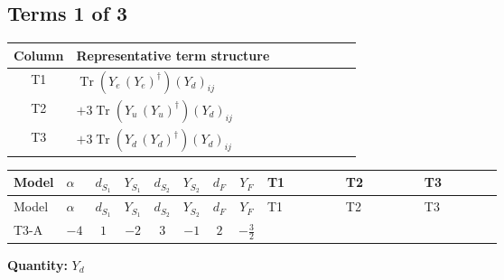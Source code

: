 \documentclass[8pt]{article}
\begin{document}
\begin{landscape}
\subsection*{Terms 1 of 3}
\begin{center}
\begin{tabular}{@{}c >{\raggedright\arraybackslash}p{0.82\linewidth}@{}}
\toprule
Column & Representative term structure \\
\midrule
T1 & \(\displaystyle \operatorname{Tr}\!\left({Y_e}\,\left({Y_e}\right)^{\dagger}\right) \left({Y_d}\right)_{ij}\) \\
\midrule
T2 & \(\displaystyle +3 \operatorname{Tr}\!\left({Y_u}\,\left({Y_u}\right)^{\dagger}\right) \left({Y_d}\right)_{ij}\) \\
\midrule
T3 & \(\displaystyle +3 \operatorname{Tr}\!\left({Y_d}\,\left({Y_d}\right)^{\dagger}\right) \left({Y_d}\right)_{ij}\) \\
\midrule
\bottomrule
\end{tabular}
\end{center}
\smallskip
\tiny
\begin{longtable}{@{}llcccccc >{\raggedright\arraybackslash}p{0.21\linewidth} >{\raggedright\arraybackslash}p{0.21\linewidth} >{\raggedright\arraybackslash}p{0.21\linewidth}@{}}
\toprule
Model & $\alpha$ & $d_{S_1}$ & $Y_{S_1}$ & $d_{S_2}$ & $Y_{S_2}$ & $d_F$ & $Y_F$ & T1 & T2 & T3 \\
\midrule
\endfirsthead
\toprule
Model & $\alpha$ & $d_{S_1}$ & $Y_{S_1}$ & $d_{S_2}$ & $Y_{S_2}$ & $d_F$ & $Y_F$ & T1 & T2 & T3 \\
\midrule
\endhead
T3-A & $-4$ & $1$ & $-2$ & $3$ & $-1$ & $2$ & $-\frac{3}{2}$ & \scriptsize\adjustbox{max width=\linewidth}{$\begin{gathered} \operatorname{Tr}\!\left({Y_e}\,\left({Y_e}\right)^{\dagger}\right) \left({Y_d}\right)_{ij}\end{gathered}$} & \scriptsize\adjustbox{max width=\linewidth}{$\begin{gathered} +3 \operatorname{Tr}\!\left({Y_u}\,\left({Y_u}\right)^{\dagger}\right) \left({Y_d}\right)_{ij}\end{gathered}$} & \scriptsize\adjustbox{max width=\linewidth}{$\begin{gathered} +3 \operatorname{Tr}\!\left({Y_d}\,\left({Y_d}\right)^{\dagger}\right) \left({Y_d}\right)_{ij}\end{gathered}$} \\
\midrule
\bottomrule
\end{longtable}
\clearpage
\noindent\textbf{Quantity: }$Y_d$\par\smallskip

\end{landscape}
\end{document}
